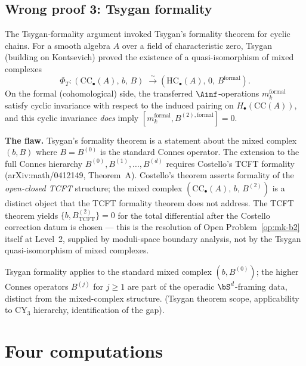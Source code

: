 \subsection{Wrong proof 3: Tsygan formality}
\label{subsec:wrong-tsygan}

\begin{remark}
\label{rem:tsygan-argument-fails}
The Tsygan-formality argument invoked Tsygan's formality theorem for
cyclic chains. For a
smooth algebra $A$ over a field of characteristic zero, Tsygan
(building on Kontsevich) proved the existence of a
quasi-isomorphism of mixed complexes
\[
 \Phi_T \colon (\mathrm{CC}_\bullet(A),\, b,\, B)
 \;\xrightarrow{\;\sim\;}
 (\mathrm{HC}_\bullet(A),\, 0,\, B^{\mathrm{formal}}).
\]
On the formal (cohomological) side, the transferred
$\Ainf$-operations $m_k^{\mathrm{formal}}$ satisfy cyclic
invariance with respect to the induced pairing on
$H_\bullet(\mathrm{CC}(A))$, and this cyclic invariance
\emph{does} imply $[m_k^{\mathrm{formal}}, B^{(2),\mathrm{formal}}] = 0$.

\textbf{The flaw.} Tsygan's formality theorem is a statement
about the mixed complex $(b, B)$ where $B = B^{(0)}$ is the
standard Connes operator. The extension to the full Connes
hierarchy $B^{(0)}, B^{(1)}, \ldots, B^{(d)}$ requires Costello's
TCFT formality (arXiv:math/0412149, Theorem~A). Costello's theorem
asserts formality of the \emph{open-closed TCFT} structure; the
mixed complex $(\mathrm{CC}_\bullet(A),\, b,\, B^{(2)})$ is a
distinct object that the TCFT formality theorem does not address.
The TCFT theorem yields
$\{b, B^{(2)}_{\mathrm{TCFT}}\} = 0$ for the total differential
after the Costello correction datum is chosen — this is the resolution
of Open Problem~\ref{op:mk-b2} itself at Level~2, supplied by
moduli-space boundary analysis, not by the Tsygan quasi-isomorphism
of mixed complexes.

Tsygan formality applies to the standard mixed complex $(b, B^{(0)})$;
the higher Connes operators $B^{(j)}$ for $j \geq 1$ are part of
the operadic $\bS^d$-framing data, distinct from the mixed-complex
structure.
(Tsygan theorem scope, applicability to CY$_3$ hierarchy,
identification of the gap).
\end{remark}


\section{Four computations}
\label{sec:m3b2-computations}

